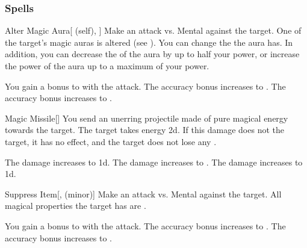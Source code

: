 \subsubsection{Spells}


\lowercase{\hypertarget{spell:Alter Magic Aura}{}}\label{spell:Alter Magic Aura}
\begin{attuneability}[Rank 1]{\hypertarget{spell:Alter Magic Aura}{Alter Magic Aura}}[ (self), ]
Make an attack vs. Mental against the target.
\hit One of the target's magic auras is altered (see ).
You can change the  the aura has.
In addition, you can decrease the  of the aura by up to half your power, or increase the power of the aura up to a maximum of your power.

\rankline
{} You gain a  bonus to  with the attack.
 The accuracy bonus increases to .
 The accuracy bonus increases to .
\end{attuneability}
\vspace{0.25em}



\lowercase{\hypertarget{spell:Magic Missile}{}}\label{spell:Magic Missile}
\begin{freeability}[Rank 1]{\hypertarget{spell:Magic Missile}{Magic Missile}}[]
You send an unerring projectile made of pure magical energy towards the target.
The target takes energy  \minus2d.
If this damage does not  the target, it has no effect, and the target does not lose any .

\rankline
{} The damage increases to  \minus1d.
 The damage increases to .
 The damage increases to  \plus1d.
\end{freeability}
\vspace{0.25em}



\lowercase{\hypertarget{spell:Suppress Item}{}}\label{spell:Suppress Item}
\begin{freeability}[Rank 1]{\hypertarget{spell:Suppress Item}{Suppress Item}}[,  (minor)]
Make an attack vs. Mental against the target.
\hit All magical properties the target has are .

\rankline
{} You gain a  bonus to  with the attack.
 The accuracy bonus increases to .
 The accuracy bonus increases to .
\end{freeability}
\vspace{0.25em}



